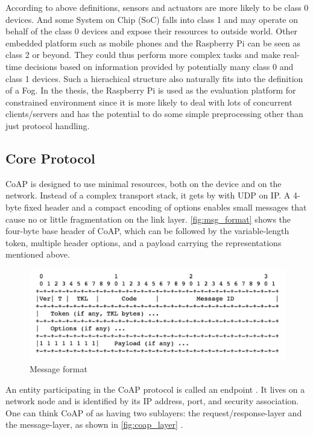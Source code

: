 According to above definitions, sensors and actuators are more likely to be class 0 devices. And some System on Chip (SoC) falls into class 1 and may operate on behalf of the class 0 devices and expose their resources to outside world. Other embedded platform such as mobile phones and the Raspberry Pi \cite{raspberry_pi} can be seen as class 2 or beyond. They could thus perform more complex tasks and make real-time decisions based on information provided by potentially many class 0 and class 1 devices. Such a hierachical structure also naturally fits into the definition of a Fog. In the thesis, the Raspberry Pi is used as the evaluation platform for constrained environment since it is more likely to deal with lots of concurrent clients/servers and has the potential to do some simple preprocessing other than just protocol handling.


\subsection{Core Protocol}\label{core_protocol}

CoAP is designed to use minimal resources, both on the device and on the network. Instead of a complex transport stack, it gets by with UDP on IP. A 4-byte fixed header and a compact encoding of options enables small messages that cause no or little fragmentation on the link layer. \autoref{fig:msg_format} \cite{coap_protocol} shows the four-byte base header of CoAP, which can be followed by the variable-length token, multiple header options, and a payload carrying the representations mentioned above.

\begin{figure}[!htbp]
\centering
\includegraphics[scale = 0.55]{msg_format.png}
\caption{Message format}
\label{fig:msg_format}
\end{figure}

An entity participating in the CoAP protocol is called an endpoint \cite{coap_protocol}. It lives on a network node and is identified by its IP address, port, and security association. One can think CoAP of as having two sublayers: the request/response-layer and the message-layer, as shown in \autoref{fig:coap_layer} \cite{coap_protocol}.

